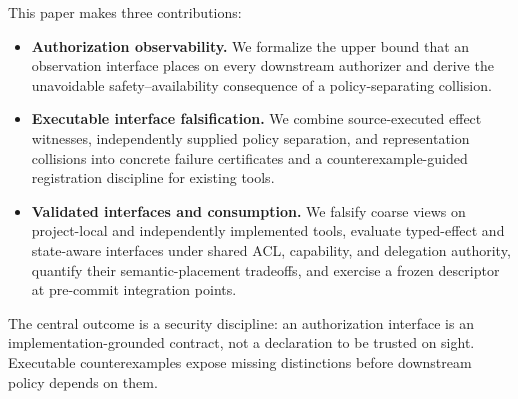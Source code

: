 This paper makes three contributions:
\begin{itemize}[leftmargin=*]
  \item \textbf{Authorization observability.} We formalize the upper bound that
  an observation interface places on every downstream authorizer and derive the
  unavoidable safety--availability consequence of a policy-separating
  collision.
  \item \textbf{Executable interface falsification.} We combine source-executed
  effect witnesses, independently supplied policy separation, and
  representation collisions into concrete failure certificates and a
  counterexample-guided registration discipline for existing tools.
  \item \textbf{Validated interfaces and consumption.} We falsify coarse views
  on project-local and independently implemented tools, evaluate typed-effect
  and state-aware interfaces under shared ACL, capability, and delegation
  authority, quantify their semantic-placement tradeoffs, and exercise a
  frozen descriptor at pre-commit integration points.
\end{itemize}

The central outcome is a security discipline: an authorization interface is an
implementation-grounded contract, not a declaration to be trusted on sight.
Executable counterexamples expose missing distinctions before downstream policy
depends on them.
